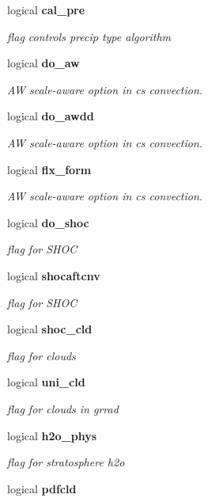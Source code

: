 \begin{DoxyCompactItemize}
logical \textbf{ cal\+\_\+pre}
\begin{DoxyCompactList}\small\item\em flag controls precip type algorithm \end{DoxyCompactList}\item 
logical \textbf{ do\+\_\+aw}
\begin{DoxyCompactList}\small\item\em AW scale-\/aware option in cs convection. \end{DoxyCompactList}\item 
logical \textbf{ do\+\_\+awdd}
\begin{DoxyCompactList}\small\item\em AW scale-\/aware option in cs convection. \end{DoxyCompactList}\item 
logical \textbf{ flx\+\_\+form}
\begin{DoxyCompactList}\small\item\em AW scale-\/aware option in cs convection. \end{DoxyCompactList}\item 
logical \textbf{ do\+\_\+shoc}
\begin{DoxyCompactList}\small\item\em flag for S\+H\+OC \end{DoxyCompactList}\item 
logical \textbf{ shocaftcnv}
\begin{DoxyCompactList}\small\item\em flag for S\+H\+OC \end{DoxyCompactList}\item 
logical \textbf{ shoc\+\_\+cld}
\begin{DoxyCompactList}\small\item\em flag for clouds \end{DoxyCompactList}\item 
logical \textbf{ uni\+\_\+cld}
\begin{DoxyCompactList}\small\item\em flag for clouds in grrad \end{DoxyCompactList}\item 
logical \textbf{ h2o\+\_\+phys}
\begin{DoxyCompactList}\small\item\em flag for stratosphere h2o \end{DoxyCompactList}\item 
logical \textbf{ pdfcld}

\end{DoxyCompactItemize}
